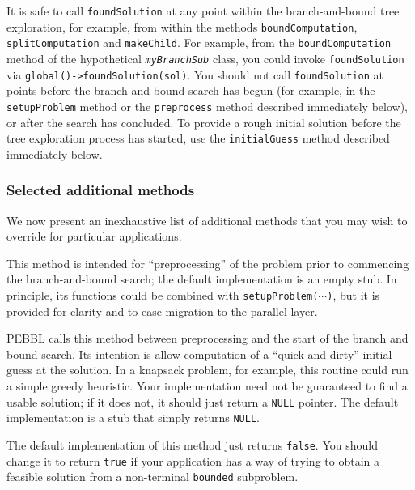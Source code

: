 It is safe to call \texttt{foundSolution} at any point within the
branch-and-bound tree exploration, for example, from within the
methods \texttt{boundComputation}, \texttt{splitComputation} and
\texttt{makeChild}.  For example, from the \texttt{boundComputation}
method of the hypothetical \texttt{\emph{myBranchSub}} class, you
could invoke \texttt{foundSolution} via
\texttt{global()->foundSolution(sol)}.  You should not call
\texttt{foundSolution} at points before the branch-and-bound search
has begun (for example, in the \texttt{setupProblem} method or the
\texttt{preprocess} method described immediately below), or after the
search has concluded.  To provide a rough initial solution before the
tree exploration process has started, use the \texttt{initialGuess}
method described immediately below.


\subsubsection{Selected additional methods}
\label{sec:seradd}
We now present an inexhaustive list of additional methods that you may
wish to override for particular applications.

This method is intended for ``preprocessing'' of the problem prior to
commencing the branch-and-bound search; the default implementation is
an empty stub.  In principle, its functions
could be combined with \texttt{setupProblem($\cdots$)}, but it is
provided for clarity and to ease migration to the parallel layer.

 PEBBL calls this method
between preprocessing and the start of the branch and bound search.
Its intention is allow computation of a ``quick and dirty'' initial
guess at the solution.  In a knapsack problem, for example, this
routine could run a simple greedy heuristic.  Your implementation need
not be guaranteed to find a usable solution; if it does not, it should
just return a \texttt{NULL} pointer.  The default implementation is a
stub that simply returns \texttt{NULL}.

The default implementation of this method just returns \texttt{false}.
You should change it to return \texttt{true} if your application has a
way of trying to obtain a feasible solution from a non-terminal
\texttt{bounded} subproblem.  

